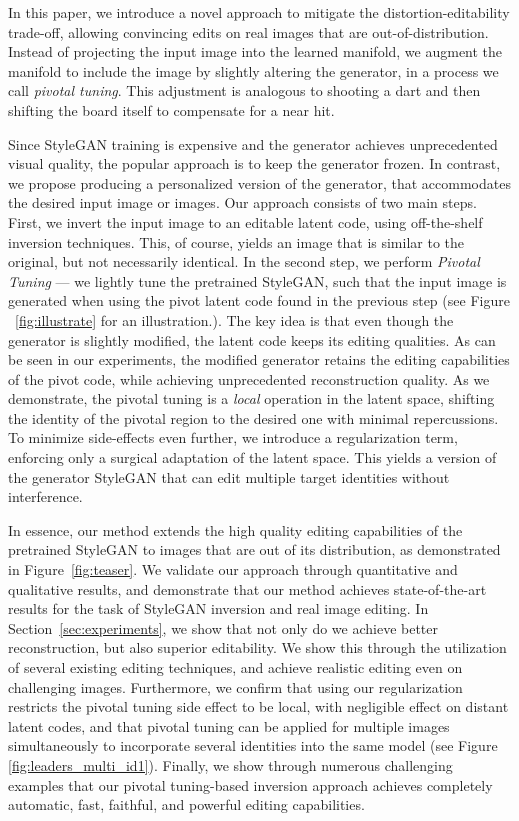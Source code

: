 In this paper, we introduce a novel approach to mitigate the distortion-editability trade-off, allowing convincing edits on real images that are out-of-distribution. Instead of projecting the input image into the learned manifold, we augment the manifold to include the image by slightly altering the generator, in a process we call \textit{pivotal tuning}. This adjustment is analogous to shooting a dart and then shifting the board itself to compensate for a near hit.

Since StyleGAN training is expensive and the generator achieves unprecedented visual quality, the popular approach is to keep the generator frozen. In contrast, we propose producing a personalized version of the generator, that accommodates the desired input image or images. Our approach consists of two main steps. First, we invert the input image to an editable latent code, using off-the-shelf inversion techniques. This, of course, yields an image that is similar to the original, but not necessarily identical. In the second step, we perform  \textit{Pivotal Tuning} --- we lightly tune the pretrained StyleGAN, such that the input image is generated when using the pivot latent code found in the previous step (see Figure ~\ref{fig:illustrate} for an illustration.). The key idea is that even though the generator is slightly modified, the latent code keeps its editing qualities. As can be seen in our experiments, the modified generator retains the editing capabilities of the pivot code, while achieving unprecedented reconstruction quality. As we demonstrate, the pivotal tuning is a \textit{local} operation in the latent space, shifting the identity of the pivotal region to the desired one with minimal repercussions. To minimize side-effects even further, we introduce a regularization term, enforcing only a surgical adaptation of the latent space. This yields a version of the generator StyleGAN that can edit multiple target identities without interference.

In essence, our method extends the high quality editing capabilities of the pretrained StyleGAN to images that are out of its distribution, as demonstrated in Figure~\ref{fig:teaser}. We validate our approach through quantitative and qualitative results, and demonstrate that our method achieves state-of-the-art results for the task of StyleGAN inversion and real image editing. In Section~\ref{sec:experiments}, we show that not only do we achieve better reconstruction, but also superior editability. We show this through the utilization of several existing editing techniques, and achieve realistic editing even on challenging images. Furthermore, we confirm that using our regularization restricts the pivotal tuning side effect to be local, with negligible effect on distant latent codes, and that pivotal tuning can be applied for multiple images simultaneously to incorporate several identities into the same model (see Figure \ref{fig:leaders_multi_id1}). Finally, we show through numerous challenging examples that our pivotal tuning-based inversion approach achieves completely automatic, fast, faithful, and powerful editing capabilities.

